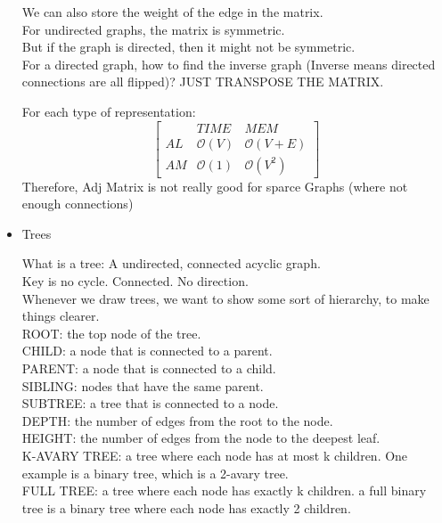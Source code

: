\begin{itemize}
\begin{definition}
			We can also store the weight of the edge in the matrix.\\
			For undirected graphs, the matrix is symmetric.\\
			But if the graph is directed, then it might not be symmetric.\\
			For a directed graph, how to find the inverse graph (Inverse means directed connections are all flipped)? JUST TRANSPOSE THE MATRIX.\\
		\end{definition}
		\begin{example}
			For each type of representation:
			$$
			\begin{bmatrix} & TIME & MEM\\AL & \mathcal O(V) & \mathcal O(V+E) \\ AM & \mathcal O(1) & \mathcal O(V^2) \end{bmatrix} 
			$$
			Therefore, Adj Matrix is not really good for sparce Graphs (where not enough connections)
		\end{example}
	\item Trees
		\begin{definition}
			What is a tree: A undirected, connected acyclic graph.\\
			Key is no cycle. Connected. No direction.\\
			Whenever we draw trees, we want to show some sort of hierarchy, to make things clearer.\\
			ROOT: the top node of the tree.\\
			CHILD: a node that is connected to a parent.\\
			PARENT: a node that is connected to a child.\\
			SIBLING: nodes that have the same parent.\\
			SUBTREE: a tree that is connected to a node.\\
			DEPTH: the number of edges from the root to the node.\\
			HEIGHT: the number of edges from the node to the deepest leaf.\\
			K-AVARY TREE: a tree where each node has at most k children. One example is a binary tree, which is a 2-avary tree.\\
			FULL TREE: a tree where each node has exactly k children. a full binary tree is a binary tree where each node has exactly 2 children.\\


\end{definition}
\end{itemize}
